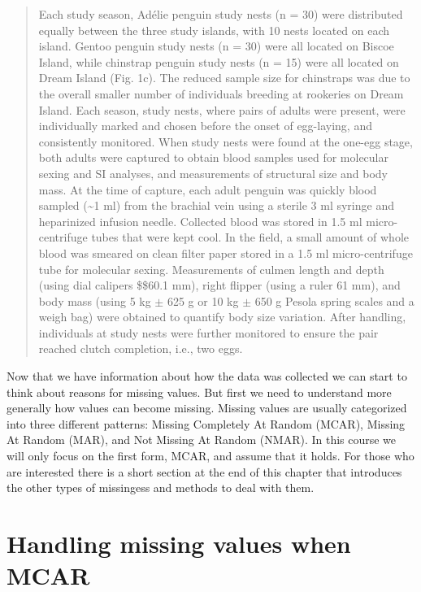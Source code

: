\documentclass[
  letterpaper,
  DIV=11,
  numbers=noendperiod]{scrreprt}
\begin{document}
\begin{quote}
Each study season, Adélie penguin study nests (n = 30) were distributed
equally between the three study islands, with 10 nests located on each
island. Gentoo penguin study nests (n = 30) were all located on Biscoe
Island, while chinstrap penguin study nests (n = 15) were all located on
Dream Island (Fig. 1c). The reduced sample size for chinstraps was due
to the overall smaller number of individuals breeding at rookeries on
Dream Island. Each season, study nests, where pairs of adults were
present, were individually marked and chosen before the onset of
egg-laying, and consistently monitored. When study nests were found at
the one-egg stage, both adults were captured to obtain blood samples
used for molecular sexing and SI analyses, and measurements of
structural size and body mass. At the time of capture, each adult
penguin was quickly blood sampled (\textasciitilde1 ml) from the
brachial vein using a sterile 3 ml syringe and heparinized infusion
needle. Collected blood was stored in 1.5 ml micro-centrifuge tubes that
were kept cool. In the field, a small amount of whole blood was smeared
on clean filter paper stored in a 1.5 ml micro-centrifuge tube for
molecular sexing. Measurements of culmen length and depth (using dial
calipers \$\pm\$60.1 mm), right flipper (using a ruler 61 mm), and body
mass (using 5 kg \(\pm\) 625 g or 10 kg \(\pm\) 650 g Pesola spring
scales and a weigh bag) were obtained to quantify body size variation.
After handling, individuals at study nests were further monitored to
ensure the pair reached clutch completion, i.e., two eggs.
\end{quote}

Now that we have information about how the data was collected we can
start to think about reasons for missing values. But first we need to
understand more generally how values can become missing. Missing values
are usually categorized into three different patterns: Missing
Completely At Random (MCAR), Missing At Random (MAR), and Not Missing At
Random (NMAR). In this course we will only focus on the first form,
MCAR, and assume that it holds. For those who are interested there is a
short section at the end of this chapter that introduces the other types
of missingess and methods to deal with them.

\section{Handling missing values when
MCAR}\label{handling-missing-values-when-mcar}
\end{document}
